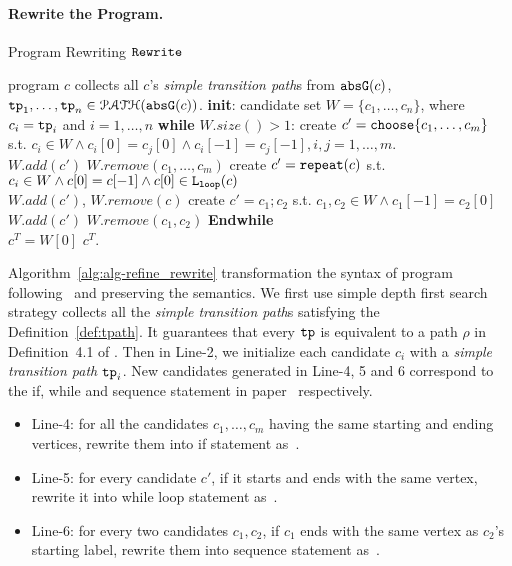\paragraph{Rewrite the Program.}
\begin{algorithm}
  \caption{Program Rewriting $\mathtt{Rewrite}$}
  \label{alg:alg-refine_rewrite}
  \begin{algorithmic}[1]
    \REQUIRE program $c$
    \STATE collects all $c$'s \emph{simple transition path}s from $\mathtt{abs}{\mathtt{G}}(c)$, $\mathtt{tp}_1, \ldots, \mathtt{tp}_n \in \mathcal{PATH}(\mathtt{abs}{\mathtt{G}}(c))$.
    \STATE \textbf{init}: candidate set $W = \{c_1, \ldots, c_n\}$, where $c_i = \mathtt{tp}_i$ and $i = 1, \ldots, n$
    \STATE \textbf{while} $W.size()> 1$:
    \STATE \quad create $c' = \rpchoose{c_1, \ldots, c_m}$ 
    s.t. $c_i \in W \land c_i[0] = c_j[0] \land c_i[-1] = c_j[-1], i, j = 1, \ldots, m$.
    \\ \quad $W.add(c')$ \qquad $W.remove(c_1, \ldots, c_m)$
    \STATE
    \quad create $c' = \mathtt{repeat}(c)$ s.t. $c_i \in W \land c[0] = c[-1] \land c[0] \in \mathtt{L}_{\mathtt{loop}}(c)$
    \\ \quad $W.add(c')$, \qquad $W.remove(c)$
    \STATE \quad create $c' = c_1; c_2$ s.t. $c_1, c_2 \in W \land c_1[-1] = c_2[0]$
    \\
    \quad $W.add(c')$ \qquad $W.remove(c_1, c_2)$
    \STATE \textbf{Endwhile}
    \\ $c^T = W[0]$
    \RETURN $c^T$.
\end{algorithmic}
\end{algorithm}
%
Algorithm~\ref{alg:alg-refine_rewrite} transformation the syntax of program following~\cite{GulwaniJK09} and preserving the semantics.
We first use simple depth first search strategy collects all the \emph{simple transition path}s satisfying the Definition~\ref{def:tpath}. It guarantees that every $\mathtt{tp}$ is equivalent to a path $\rho$ in Definition~4.1 of \cite{GulwaniJK09}.
Then
in Line-2, we initialize each candidate $c_i$ with a \emph{simple transition path} $\mathtt{tp}_i$. New candidates generated in Line-4, 5 and 6 correspond to the if,
while and sequence statement in paper~\cite{GulwaniJK09} respectively.
\begin{itemize}
  \item
  Line-4: for all the candidates $c_1, \ldots, c_m$ having the same starting and ending vertices, rewrite them into if statement as~\cite{GulwaniJK09}.
  \item
  Line-5: for every candidate $c'$, if it starts and ends with the same vertex, rewrite it into while loop statement as~\cite{GulwaniJK09}.
  \item
  Line-6: for every two candidates $c_1, c_2$, if $c_1$ ends with the same vertex as $c_2$'s starting label, rewrite them into sequence statement as~\cite{GulwaniJK09}.
\end{itemize}
